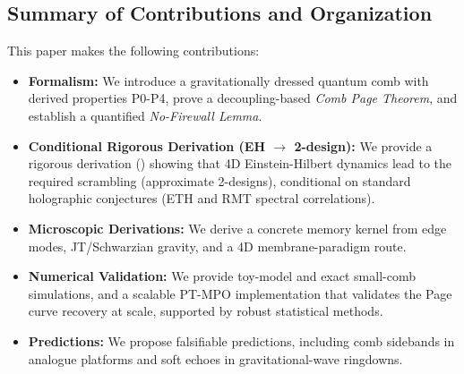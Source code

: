 \documentclass[a4paper,11pt]{article}
\theoremstyle{plain}
\theoremstyle{definition}
\theoremstyle{remark}
\begin{document}
\subsection{Summary of Contributions and Organization}
\label{sec:contributions}

This paper makes the following contributions:
\begin{itemize}[leftmargin=*]
    \item \textbf{Formalism:} We introduce a gravitationally dressed quantum comb with derived properties P0-P4, prove a decoupling-based \emph{Comb Page Theorem}, and establish a quantified \emph{No-Firewall Lemma}.
    \item \textbf{Conditional Rigorous Derivation (EH $\to$ 2-design):} We provide a rigorous derivation () showing that 4D Einstein-Hilbert dynamics lead to the required scrambling (approximate 2-designs), conditional on standard holographic conjectures (ETH and RMT spectral correlations).
    \item \textbf{Microscopic Derivations:} We derive a concrete memory kernel from edge modes, JT/Schwarzian gravity, and a 4D membrane-paradigm route.
    \item \textbf{Numerical Validation:} We provide toy-model and exact small-comb simulations, and a scalable PT-MPO implementation that validates the Page curve recovery at scale, supported by robust statistical methods.
    \item \textbf{Predictions:} We propose falsifiable predictions, including comb sidebands in analogue platforms and soft echoes in gravitational-wave ringdowns.
\end{itemize}
\end{document}
